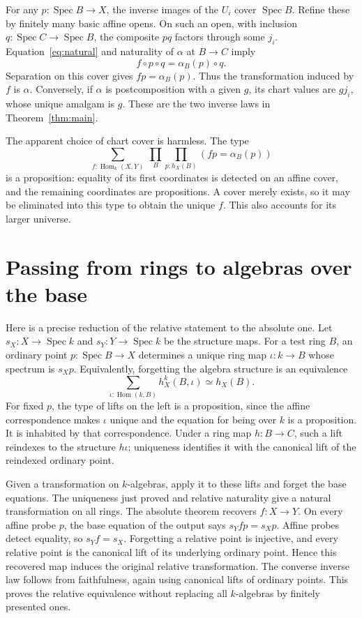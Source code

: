 \documentclass[11pt]{amsart}
\theoremstyle{remark}\newtheorem{remark}[theorem]{Remark}
\newcommand{\Hom}{\operatorname{Hom}}
\newcommand{\Spec}{\operatorname{Spec}}
\begin{document}
For any $p:\Spec B\to X$, the inverse images of the $U_i$ cover
$\Spec B$. Refine these by finitely many basic affine opens. On such
an open, with inclusion $q:\Spec C\to\Spec B$, the composite $pq$
factors through some $j_i$. Equation~\eqref{eq:natural} and naturality
of $\alpha$ at $B\to C$ imply
\[
 f\circ p\circ q=\alpha_B(p)\circ q.
\]
Separation on this cover gives $fp=\alpha_B(p)$. Thus the transformation
induced by $f$ is $\alpha$. Conversely, if $\alpha$ is postcomposition
with a given $g$, its chart values are $gj_i$, whose unique amalgam is
$g$. These are the two inverse laws in Theorem~\ref{thm:main}.

The apparent choice of chart cover is harmless. The type
\[
 \sum_{f:\Hom_k(X,Y)}\ \prod_B\prod_{p:h_X(B)}(fp=\alpha_B(p))
\]
is a proposition: equality of its first coordinates is detected on an
affine cover, and the remaining coordinates are propositions. A cover
merely exists, so it may be eliminated into this type to obtain the
unique $f$. This also accounts for its larger universe.

\section{Passing from rings to algebras over the base}
Here is a precise reduction of the relative statement to the absolute
one. Let $s_X:X\to\Spec k$ and $s_Y:Y\to\Spec k$ be the structure maps.
For a test ring $B$, an ordinary point $p:\Spec B\to X$ determines a
unique ring map $\iota:k\to B$ whose spectrum is $s_Xp$. Equivalently,
forgetting the algebra structure is an equivalence
\[
 \sum_{\iota:\Hom(k,B)}h_X^k(B,\iota)\simeq h_X(B).
\]
For fixed $p$, the type of lifts on the left is a proposition, since
the affine correspondence makes $\iota$ unique and the equation for
being over $k$ is a proposition. It is inhabited by that correspondence.
Under a ring map $h:B\to C$, such a lift reindexes to the structure
$h\iota$; uniqueness identifies it with the canonical lift of the
reindexed ordinary point.

Given a transformation on $k$-algebras, apply it to these lifts and forget
the base equations. The uniqueness just proved and relative naturality
give a natural transformation on all rings. The absolute theorem recovers
$f:X\to Y$. On every affine probe $p$, the base equation of the output
says $s_Yfp=s_Xp$. Affine probes detect equality, so $s_Yf=s_X$.
Forgetting a relative point is injective, and every relative point is
the canonical lift of its underlying ordinary point. Hence this recovered
map induces the original relative transformation. The converse inverse
law follows from faithfulness, again using canonical lifts of ordinary
points. This proves the relative equivalence without replacing all
$k$-algebras by finitely presented ones.
\end{document}
